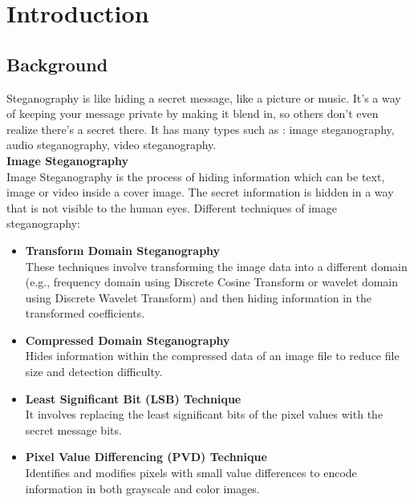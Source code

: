 \chapter{Introduction}
\section{Background}
Steganography is like hiding a secret message, like a picture or music. It's a way of keeping your message private by making it blend in, so others don't even realize there's a secret there. It has many types such as : image steganography, audio steganography, video steganography.\\
\textbf{Image Steganography}\\
Image Steganography is the process of hiding information which can be text, image or video inside a cover image. The secret information is hidden in a way that is not visible to the human eyes.
Different techniques of image steganography:
\begin{itemize}
\item \textbf{Transform Domain Steganography}\\
These techniques involve transforming the image data into a different domain (e.g., frequency domain using Discrete Cosine Transform or wavelet domain using Discrete Wavelet Transform) and then hiding information in the transformed coefficients.\\
\item \textbf{Compressed Domain Steganography}\\
Hides information within the compressed data of an image file to reduce file size and detection difficulty.\\
\item \textbf{Least Significant Bit (LSB) Technique}\\
It involves replacing the least significant bits of the pixel values with the secret message bits.\\
\item \textbf {Pixel Value Differencing (PVD) Technique}\\
Identifies and modifies pixels with small value differences to encode information in both grayscale and color images.\\
\end{itemize}
